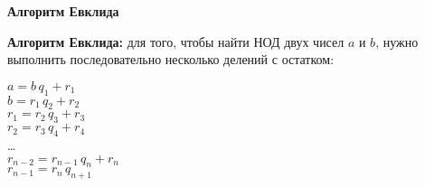 \documentclass{article}
\begin{document}
    \large

    \begin{center}
        \textbf{Алгоритм Евклида}
    \end{center}


    \textbf{Алгоритм Евклида:} для того, чтобы найти НОД двух чисел $a$ и $b$, нужно выполнить
    последовательно несколько делений с остатком:
    \begin{center}
        $a = b\,q_1 + r_1$ \\
        $b = r_1\,q_2 + r_2$ \\
        $r_1 = r_2\,q_3 + r_3$ \\
        $r_2 = r_3\,q_4 + r_4$ \\
        \dots \\
        $r_{n-2} = r_{n-1}\,q_n +r_n$ \\
        $r_{n-1} = r_n\,q_{n+1}$
    \end{center}
\end{document}
